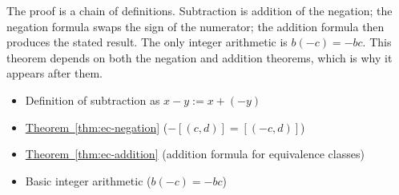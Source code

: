 \begin{remark*}
The proof is a chain of definitions. Subtraction is addition of the
negation; the negation formula swaps the sign of the numerator; the
addition formula then produces the stated result. The only integer
arithmetic is $b(-c) = -bc$. This theorem depends on both the negation
and addition theorems, which is why it appears after them.
\end{remark*}

\begin{dependencies}
\begin{itemize}
  \item Definition of subtraction as $x - y := x + (-y)$
  \item \hyperref[thm:ec-negation]{Theorem~\ref*{thm:ec-negation}}
        \textnormal{($-[(c,d)] = [(-c,d)]$)}
  \item \hyperref[thm:ec-addition]{Theorem~\ref*{thm:ec-addition}}
        \textnormal{(addition formula for equivalence classes)}
  \item Basic integer arithmetic ($b(-c) = -bc$)
\end{itemize}
\end{dependencies}

\clearpage
